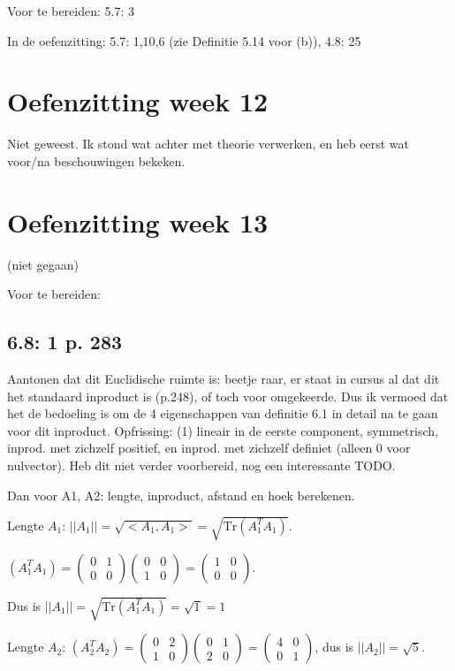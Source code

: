 \documentclass{article}
\begin{document}
Voor te bereiden: 
5.7: 3

In de oefenzitting: 
5.7: 1,10,6 (zie Definitie 5.14 voor (b)), 4.8: 25

\section{Oefenzitting week 12}

Niet geweest. Ik stond wat achter met theorie verwerken, en heb eerst wat voor/na beschouwingen bekeken. 

\section*{Oefenzitting week 13}
(niet gegaan) 


Voor te bereiden: 
\subsection*{6.8: 1 p. 283}
Aantonen dat dit Euclidische ruimte is: beetje raar, er staat in cursus al dat dit het standaard inproduct is (p.248), of toch voor omgekeerde. Dus ik vermoed dat het de bedoeling is om de 4 eigenschappen van definitie 6.1 in detail na te gaan voor dit inproduct. Opfrissing: (1) lineair in de eerste component, symmetrisch, inprod. met zichzelf positief, en inprod. met zichzelf definiet (alleen 0 voor nulvector). 
Heb dit niet verder voorbereid, nog een interessante TODO. 

Dan voor A1, A2: lengte, inproduct, afstand en hoek berekenen. 

Lengte $A_1$: $||A_1|| = \sqrt{ <A_1, A_1>} = \sqrt{ \text{Tr} (A_1^T A_1)  }$. 

$(A_1^T A_1) =\begin{pmatrix} 0 & 1 \\ 0 & 0  \end{pmatrix}    \begin{pmatrix} 0 & 0 \\ 1 & 0  \end{pmatrix} = \begin{pmatrix} 1 & 0 \\ 0 & 0  \end{pmatrix}$. 

Dus is $||A_1|| = \sqrt{ \text{Tr} (A_1^T A_1)} = \sqrt{ 1 } = 1 $ 

Lengte $A_2$:  
$(A_2^T A_2) =\begin{pmatrix} 0 & 2 \\ 1 & 0  \end{pmatrix}  \begin{pmatrix} 0 & 1 \\ 2 & 0  \end{pmatrix} = \begin{pmatrix} 4 & 0 \\ 0 & 1  \end{pmatrix} $, dus is $|| A_2 || = \sqrt{5}$. 
\end{document}

